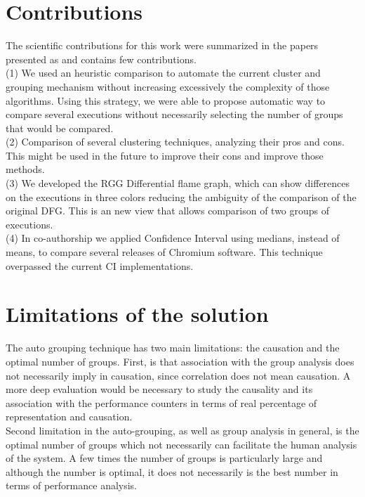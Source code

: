 \section{Contributions}
The scientific contributions for this work were summarized in the papers presented as and contains few contributions. \\
(1) We used an heuristic comparison to automate the current cluster and grouping mechanism without increasing excessively the complexity of those algorithms. Using this strategy, we were able to propose automatic way to compare several executions without necessarily selecting the number of groups that would be compared.\\
(2) Comparison of several clustering techniques, analyzing their pros and cons. This might be used in the future to improve their cons and improve those methods.\\ 
(3) We developed the RGG Differential flame graph, which can show differences on the executions in three colors reducing the ambiguity of the comparison of the original DFG. This is an new view that allows comparison of two groups of executions. \\
(4) In co-authorship we applied Confidence Interval using medians, instead of means, to compare several releases of Chromium software. This technique overpassed the current CI implementations.

\section{Limitations of the solution}
The auto grouping technique has two main limitations: the causation and the optimal number of groups.
First, is that association with the group analysis does not necessarily imply in causation, since correlation does not mean causation. A more deep evaluation would be necessary to study the causality and its association with the performance counters in terms of real percentage of representation and causation.\\
Second limitation in the auto-grouping, as well as group analysis in general, is the optimal number of groups which not necessarily can facilitate the human analysis of the system. A few times the number of groups is particularly large and although the number is optimal, it does not necessarily is the best number in terms of performance analysis.

